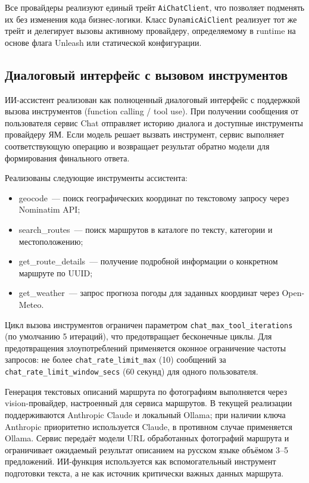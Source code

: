 Все провайдеры реализуют единый трейт \texttt{AiChatClient}, что позволяет подменять их без изменения кода бизнес-логики. Класс \texttt{DynamicAiClient} реализует тот же трейт и делегирует вызовы активному провайдеру, определяемому в runtime на основе флага Unleash или статической конфигурации.

\subsection{Диалоговый интерфейс с вызовом инструментов}

ИИ-ассистент реализован как полноценный диалоговый интерфейс с поддержкой вызова инструментов (function calling / tool use). При получении сообщения от пользователя сервис Chat отправляет историю диалога и доступные инструменты провайдеру ЯМ. Если модель решает вызвать инструмент, сервис выполняет соответствующую операцию и возвращает результат обратно модели для формирования финального ответа.

Реализованы следующие инструменты ассистента:
\begin{itemize}
  \item geocode~--- поиск географических координат по текстовому запросу через Nominatim API;
  \item search\_routes~--- поиск маршрутов в каталоге по тексту, категории и местоположению;
  \item get\_route\_details~--- получение подробной информации о конкретном маршруте по UUID;
  \item get\_weather~--- запрос прогноза погоды для заданных координат через Open-Meteo.
\end{itemize}

Цикл вызова инструментов ограничен параметром \texttt{chat\_max\_tool\_iterations} (по умолчанию 5 итераций), что предотвращает бесконечные циклы. Для предотвращения злоупотреблений применяется оконное ограничение частоты запросов: не более \texttt{chat\_rate\_limit\_max} (10) сообщений за \texttt{chat\_rate\_limit\_window\_secs} (60 секунд) для одного пользователя.

Генерация текстовых описаний маршрута по фотографиям выполняется через
vision-провайдер, настроенный для сервиса маршрутов. В текущей реализации
поддерживаются Anthropic Claude и локальный Ollama; при наличии ключа Anthropic
приоритетно используется Claude, в противном случае применяется Ollama. Сервис
передаёт модели URL обработанных фотографий маршрута и ограничивает ожидаемый
результат описанием на русском языке объёмом 3--5 предложений. ИИ-функция
используется как вспомогательный инструмент подготовки текста, а не как источник
критически важных данных маршрута.

